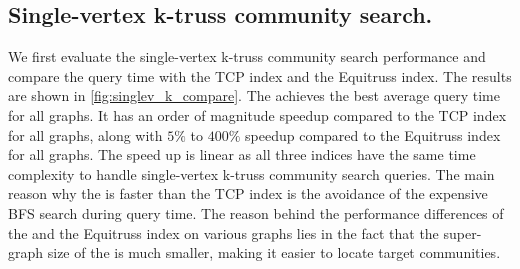 \subsection{Single-vertex k-truss community search.}
\label{eval_singlev_k_compare}

We first evaluate the single-vertex k-truss community search performance and compare the query time with the TCP index and the Equitruss index. The results are shown in \autoref{fig:singlev_k_compare}. The \twolevelindex{} achieves the best average query time for all graphs. It has an order of magnitude speedup compared to the TCP index for all graphs, along with $5\%$ to $400\%$ speedup compared to the Equitruss index for all graphs. The speed up is linear as all three indices have the same time complexity to handle single-vertex k-truss community search queries. 
The main reason why the \twolevelindex{} is faster than the TCP index is the avoidance of the expensive BFS search during query time. The reason behind the performance differences of the \twolevelindex{} and the Equitruss index on various graphs lies in the fact that the super-graph size of the \twolevelindex{} is much smaller, making it easier to locate target communities.

